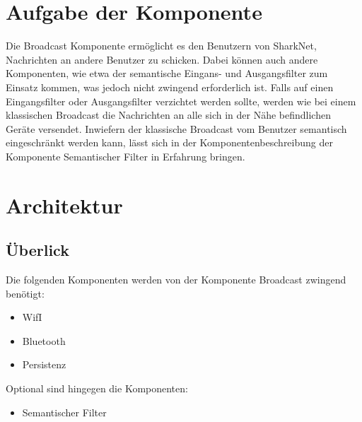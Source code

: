 \section{Aufgabe der Komponente}
Die Broadcast Komponente ermöglicht es den Benutzern von SharkNet, Nachrichten an andere Benutzer zu schicken. Dabei können auch andere Komponenten, wie etwa der semantische Eingans- und Ausgangsfilter zum Einsatz kommen, was jedoch nicht zwingend erforderlich ist. Falls auf einen Eingangsfilter oder Ausgangsfilter verzichtet werden sollte, werden wie bei einem klassischen Broadcast die Nachrichten an alle sich in der Nähe befindlichen Geräte versendet. Inwiefern der klassische Broadcast vom Benutzer semantisch eingeschränkt werden kann, lässt sich in der Komponentenbeschreibung der Komponente Semantischer Filter in Erfahrung bringen.

\section{Architektur}

\subsection{Überlick}\label{ch:broadcastcomps}
Die folgenden Komponenten werden von der Komponente Broadcast zwingend benötigt:
\begin{itemize}
\item WifI 
\item Bluetooth 
\item Persistenz 
\end{itemize}
Optional sind hingegen die Komponenten:
\begin{itemize}
	\item Semantischer Filter
\end{itemize}

